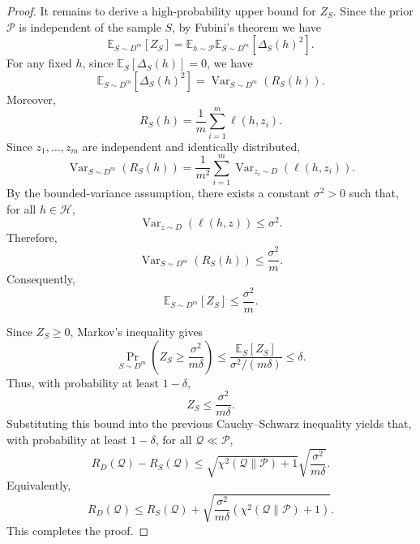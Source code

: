 \documentclass[10pt,a4paper]{amsart}
\begin{document}
\begin{proof}
It remains to derive a high-probability upper bound for $Z_S$. Since the prior $\mathcal P$ is independent of the sample $S$, by Fubini's theorem we have
\begin{equation}
\mathbb E_{S\sim D^m}[Z_S]
=
\mathbb E_{h\sim\mathcal P}
\mathbb E_{S\sim D^m}[\Delta_S(h)^2].
\end{equation}
For any fixed $h$, since $\mathbb E_S[\Delta_S(h)]=0$, we have
\begin{equation}
\mathbb E_{S\sim D^m}[\Delta_S(h)^2]
=
\operatorname{Var}_{S\sim D^m}(R_S(h)).
\end{equation}
Moreover,
\begin{equation}
R_S(h)=\frac{1}{m}\sum_{i=1}^m \ell(h,z_i).
\end{equation}
Since $z_1,\ldots,z_m$ are independent and identically distributed,
\begin{equation}
\operatorname{Var}_{S\sim D^m}(R_S(h))
=
\frac{1}{m^2}
\sum_{i=1}^m
\operatorname{Var}_{z_i\sim D}(\ell(h,z_i)).
\end{equation}
By the bounded-variance assumption, there exists a constant $\sigma^2>0$ such that, for all $h\in\mathcal H$,
\begin{equation}
\operatorname{Var}_{z\sim D}(\ell(h,z))\le \sigma^2.
\end{equation}
Therefore,
\begin{equation}
\operatorname{Var}_{S\sim D^m}(R_S(h))
\le
\frac{\sigma^2}{m}.
\end{equation}
Consequently,
\begin{equation}
\mathbb E_{S\sim D^m}[Z_S]
\le
\frac{\sigma^2}{m}.
\end{equation}

Since $Z_S\ge 0$, Markov's inequality gives
\begin{equation}
\Pr_{S\sim D^m}
\left(
Z_S
\ge
\frac{\sigma^2}{m\delta}
\right)
\le
\frac{\mathbb E_S[Z_S]}{\sigma^2/(m\delta)}
\le
\delta.
\end{equation}
Thus, with probability at least $1-\delta$,
\begin{equation}
Z_S
\le
\frac{\sigma^2}{m\delta}.
\end{equation}
Substituting this bound into the previous Cauchy--Schwarz inequality yields that, with probability at least $1-\delta$, for all $\mathcal Q\ll\mathcal P$,
\begin{equation}
R_D(\mathcal Q)-R_S(\mathcal Q)
\le
\sqrt{\chi^2(\mathcal Q\|\mathcal P)+1}
\sqrt{\frac{\sigma^2}{m\delta}}.
\end{equation}
Equivalently,
\begin{equation}
R_D(\mathcal Q)
\le
R_S(\mathcal Q)
+
\sqrt{
\frac{\sigma^2}{m\delta}
\left(
\chi^2(\mathcal Q\|\mathcal P)+1
\right)
}.
\end{equation}
This completes the proof.
\end{proof}
\end{document}
